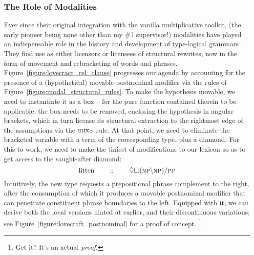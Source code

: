\subsubsection{The Role of Modalities}
Ever since their original integration with the vanilla multiplicative toolkit, (the early pioneer being none other than my \#1 supervisor!) modalities have played an indispensable role in the history and development of type-logical grammars~\cite{hendriks1995ellipsis, moortgat1996multimodal,kurtonina1997structural,moortgat1997categorial,vermaat1999controlling}.
They find use as either licensors or licensees of structural rewrites, now in the form of movement and rebracketing of words and phrases.
Figure~\ref{figure:lovecract_rel_clause} progresses our agenda by accounting for the presence of a (hypothetical) movable postnominal modifier via the rules of Figure~\ref{figure:modal_structural_rules}.
To make the hypothesis movable, we need to instantiate it as a box -- for the pure function contained therein to be applicable, the box needs to be removed, enclosing the hypothesis in angular brackets, which in turn license its structural extraction to the rightmost edge of the assumptions via the $\rulestyle{mix}_{\diamond}$ rule.
At that point, we need to eliminate the bracketed variable with a term of the corresponding type, plus a diamond.
For this to work, we need to make the tiniest of modifications to our lexicon so as to get access to the saught-after diamond:
\begin{equation}\label{equation:litten}
	\w{litten} \qquad :: \qquad \diamond\Box (\np[s]\divleft\np[s])\divright\pp[s]
\end{equation}
Intuitively, the new type requests a prepositional phrase complement to the right, after the consumption of which it produces a movable postnominal modifier that can penetrate constituent phrase boundaries to the left.
Equipped with it, we can derive both the local versions hinted at earlier, and their discontinuous variations; see Figure~\ref{figure:lovecraft_postnominal} for a proof of concept.%
\footnote{Get it? It's an actual \textit{proof}.} 

